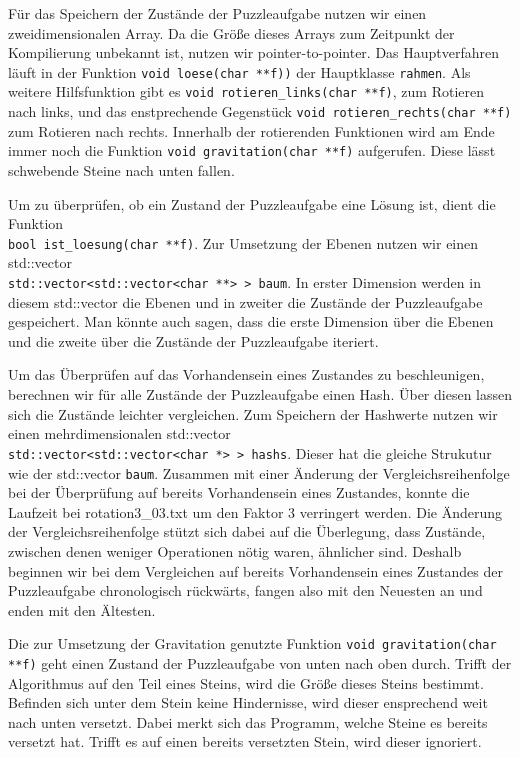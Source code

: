 	Für das Speichern der Zustände der Puzzleaufgabe nutzen wir einen zweidimensionalen Array. 
	Da die Größe dieses Arrays zum Zeitpunkt der Kompilierung unbekannt ist, nutzen wir pointer-to-pointer.
	Das Hauptverfahren läuft in der Funktion \texttt{void loese(char **f))} der Hauptklasse \texttt{rahmen}.
  Als weitere Hilfsfunktion gibt es \texttt{void rotieren\_links(char **f)}, zum Rotieren nach links, 
	und das enstprechende Gegenstück \texttt{void rotieren\_rechts(char **f)} zum Rotieren nach rechts.
	Innerhalb der rotierenden Funktionen wird am Ende immer noch die Funktion \texttt{void gravitation(char **f)} aufgerufen.
	Diese lässt schwebende Steine nach unten fallen. 
	
	Um zu überprüfen, ob ein Zustand der Puzzleaufgabe eine Lösung ist, dient die Funktion \\
	\texttt{bool ist\_loesung(char **f)}.
	Zur Umsetzung der Ebenen nutzen wir einen std::vector \\\texttt{std::vector<std::vector<char **> > baum}.
	In erster Dimension werden in diesem std::vector die Ebenen und in zweiter die Zustände der Puzzleaufgabe gespeichert. 
	Man könnte auch sagen, dass die erste Dimension über die Ebenen und die zweite über die Zustände der Puzzleaufgabe iteriert.

	Um das Überprüfen auf das Vorhandensein eines Zustandes zu beschleunigen, berechnen wir für alle Zustände der Puzzleaufgabe einen Hash.
	Über diesen lassen sich  die Zustände leichter vergleichen. Zum Speichern der Hashwerte nutzen 
	wir einen mehrdimensionalen std::vector \\\texttt{std::vector<std::vector<char *> > hashs}. Dieser hat die gleiche Strukutur wie der std::vector \texttt{baum}.
	 Zusammen mit einer Änderung der Vergleichsreihenfolge
	bei der Überprüfung auf bereits Vorhandensein eines Zustandes, konnte die Laufzeit bei rotation3\_03.txt um den Faktor 3 verringert werden.
	Die Änderung der Vergleichsreihenfolge stützt sich dabei auf die Überlegung, dass Zustände, zwischen denen weniger Operationen nötig waren, ähnlicher sind.
	Deshalb beginnen wir bei dem Vergleichen auf bereits Vorhandensein eines Zustandes der Puzzleaufgabe chronologisch rückwärts, 
	fangen also mit den Neuesten an und enden mit den Ältesten.

	Die zur Umsetzung der Gravitation genutzte Funktion \texttt{void gravitation(char **f)} geht einen Zustand der Puzzleaufgabe von unten nach oben durch.
	Trifft der Algorithmus auf den Teil eines Steins, wird die Größe dieses Steins bestimmt. Befinden sich unter dem Stein keine Hindernisse, 
	wird dieser ensprechend weit nach unten versetzt. Dabei merkt sich das Programm, welche Steine es bereits versetzt hat. 
	Trifft es auf einen bereits versetzten Stein, wird dieser ignoriert.

 
	
	
